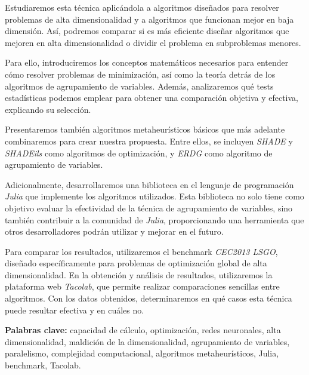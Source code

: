 Estudiaremos esta técnica aplicándola a algoritmos diseñados para resolver problemas de alta dimensionalidad y a algoritmos que funcionan mejor en baja dimensión. Así, podremos comparar si es más eficiente diseñar algoritmos que mejoren en alta dimensionalidad o dividir el problema en subproblemas menores.

Para ello, introduciremos los conceptos matemáticos necesarios para entender cómo resolver problemas de minimización, así como la teoría detrás de los algoritmos de agrupamiento de variables. Además, analizaremos qué tests estadísticas podemos emplear para obtener una comparación objetiva y efectiva, explicando su selección.

Presentaremos también algoritmos metaheurísticos básicos que más adelante combinaremos para crear nuestra propuesta. Entre ellos, se incluyen \textit{SHADE} y \textit{SHADEils} como algoritmos de optimización, y \textit{ERDG} como algoritmo de agrupamiento de variables.

Adicionalmente, desarrollaremos una biblioteca en el lenguaje de programación \textit{Julia} que implemente los algoritmos utilizados. Esta biblioteca no solo tiene como objetivo evaluar la efectividad de la técnica de agrupamiento de variables, sino también contribuir a la comunidad de \textit{Julia}, proporcionando una herramienta que otros desarrolladores podrán utilizar y mejorar en el futuro.

Para comparar los resultados, utilizaremos el benchmark \textit{CEC2013 LSGO}, diseñado específicamente para problemas de optimización global de alta dimensionalidad. En la obtención y análisis de resultados, utilizaremos la plataforma web \textit{Tacolab}, que permite realizar comparaciones sencillas entre algoritmos. Con los datos obtenidos, determinaremos en qué casos esta técnica puede resultar efectiva y en cuáles no.

\textbf{Palabras clave:} capacidad de cálculo, optimización, redes neuronales, alta dimensionalidad, maldición de la dimensionalidad, agrupamiento de variables, paralelismo, complejidad computacional, algoritmos metaheurísticos, Julia, benchmark, Tacolab.

\endinput

